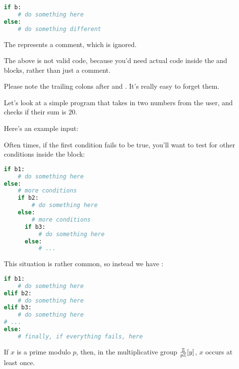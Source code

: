 \begin{lstlisting}[language=Python]
if b:
    # do something here
else:
    # do something different
\end{lstlisting}

The \code{#} represents a comment, which is ignored.

\begin{remark}
  The above is not valid code, because you'd need actual code inside
  the  and  blocks, rather than just a comment.
\end{remark}

\begin{remark}
  Please note the trailing colons after  and
  . It's really easy to forget them.
\end{remark}

Let's look at a simple program that takes in two numbers from the
user, and checks if their sum is $20$.


Here's an example input:


Often times, if the first condition fails to be true, you'll want to
test for other conditions inside the  block:

\begin{lstlisting}[language=Python]
if b1:
    # do something here
else:
    # more conditions
    if b2:
        # do something here
    else:
        # more conditions
      if b3:
          # do something here
      else:
          # ...
\end{lstlisting}

This situation is rather common, so instead we have :

\begin{lstlisting}[language=Python]
if b1:
    # do something here
elif b2:
    # do something here
elif b3:
    # do something here
# ...
else:
    # finally, if everything fails, here
\end{lstlisting}

If $x$ is a prime modulo $p$, then, in the multiplicative group
$\frac{\mathbb{Z}}{p\mathbb{Z}}[y]$, $x$ occurs at least once.